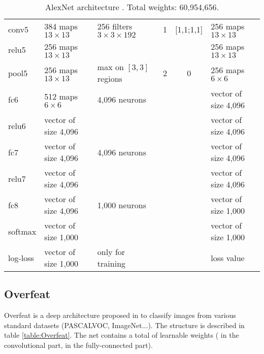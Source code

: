 \begin{table}[h]
\begin{center}
\begin{tabular}{|l||l||l|c|c||l|}
   \hline
   conv5      & 384 maps $13 \times 13$          & 256 filters $3 \times 3 \times 192$     & 1      & [1,1;1,1] & 256 maps $13 \times 13$  \\
   relu5      & 256 maps $13 \times 13$          &                                         &        &           & 256 maps $13 \times 13$  \\
   pool5      & 256 maps $13 \times 13$          & max on $[3,3]$ regions                  & 2      & 0         & 256 maps $6 \times 6$    \\
   \hline
   fc6        & 512 maps $6 \times 6$            & 4,096 neurons                           &        &           & vector of size 4,096     \\
   relu6      & vector of size 4,096             &                                         &        &           & vector of size 4,096     \\
   \hline
   fc7        & vector of size 4,096             & 4,096 neurons                           &        &           & vector of size 4,096     \\
   relu7      & vector of size 4,096             &                                         &        &           & vector of size 4,096     \\
   \hline
   fc8        & vector of size 4,096             & 1,000 neurons                           &        &           & vector of size 1,000     \\
   softmax    & vector of size 1,000             &                                         &        &           & vector of size 1,000     \\
   log-loss   & vector of size 1,000             & only for training                       &        &           & loss value               \\
   \hline 
 \end{tabular}
 \caption{AlexNet architecture \cite{Krizhevsky12}. Total weights: 60,954,656.}
 \label{table:AlexNet}
\end{center}
\end{table} 







\subsection{Overfeat}

Overfeat is a deep architecture proposed in \cite{Sermanet14overfeat} to classify images from various standard datasets (PASCALVOC, ImageNet...). The 
structure is described in table \ref{table:Overfeat}. The net contains a total of \textbf{} learnable weights ( in the convolutional part,  in 
the fully-connected part).

